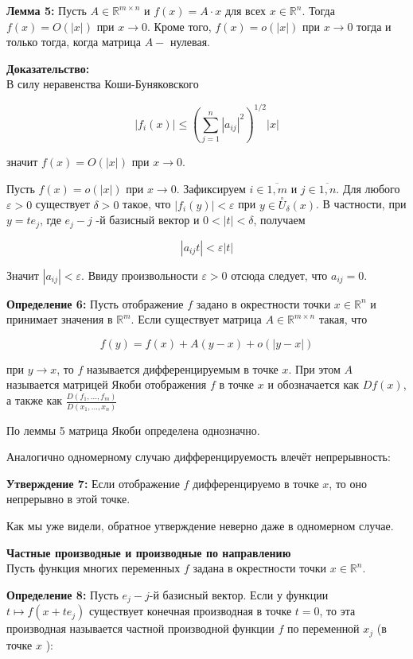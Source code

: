 \documentclass[a4paper,12pt]{article} %
\begin{document}
\textbf{Лемма 5:} Пусть $A \in \mathbb{R}^{m \times n}$ и $f(x)=A \cdot x$ для всех $x \in \mathbb{R}^{n}$. Тогда $f(x)=O(|x|)$ при $x \rightarrow 0$. Кроме того, $f(x)=o(|x|)$ при $x \rightarrow 0$ тогда и только тогда, когда матрица $A-$ нулевая.

\textbf{Доказательство:}\\
В силу неравенства Коши-Буняковского

$$
\left|f_{i}(x)\right| \leq\left(\sum_{j=1}^{n}\left|a_{i j}\right|^{2}\right)^{1 / 2}|x|
$$

значит $f(x)=O(|x|)$ при $x \rightarrow 0$.

Пусть $f(x)=o(|x|)$ при $x \rightarrow 0$. Зафиксируем $i \in \overline{1, m}$ и $j \in \overline{1, n}$. Для любого $\varepsilon>0$ существует $\delta>0$ такое, что $\left|f_{i}(y)\right|<\varepsilon$ при $y \in \stackrel{\circ}{U}_{\delta}(x)$. В частности, при $y=t e_{j}$, где $e_{j}-j$ -й базисный вектор и $0<|t|<\delta$, получаем

$$
\left|a_{i j} t\right|<\varepsilon|t|
$$

Значит $\left|a_{i j}\right|<\varepsilon$. Ввиду произвольности $\varepsilon>0$ отсюда следует, что $a_{i j}=0$.

\textbf{Определение 6:} Пусть отображение $f$ задано в окрестности точки $x \in \mathbb{R}^{n}$ и принимает значения в $\mathbb{R}^{m}$. Если существует матрица $A \in \mathbb{R}^{m \times n}$ такая, что

$$
f(y)=f(x)+A(y-x)+o(|y-x|)
$$

при $y \rightarrow x$, то $f$ называется дифференцируемым в точке $x$. При этом $A$ называется матрицей Якоби отображения $f$ в точке $x$ и обозначается как $D f(x)$, а также как $\frac{D\left(f_{1}, \ldots, f_{m}\right)}{D\left(x_{1}, \ldots, x_{n}\right)}$

По леммы 5 матрица Якоби определена однозначно.

Аналогично одномерному случаю дифференцируемость влечёт непрерывность:

\textbf{Утверждение 7:} Если отображение $f$ дифференцируемо в точке $x$, то оно непрерывно в этой точке.

Как мы уже видели, обратное утверждение неверно даже в одномерном случае.

\textbf{Частные производные и производные по направлению}\\
Пусть функция многих переменных $f$ задана в окрестности точки $x \in \mathbb{R}^{n}$.

\textbf{Определение 8:} Пусть $e_{j}-j$-й базисный вектор. Если у функции $t \mapsto f\left(x+t e_{j}\right)$ существует конечная производная в точке $t=0$, то эта производная называется частной производной функции $f$ по переменной $x_{j}$ (в точке $x$ ):
\end{document}
